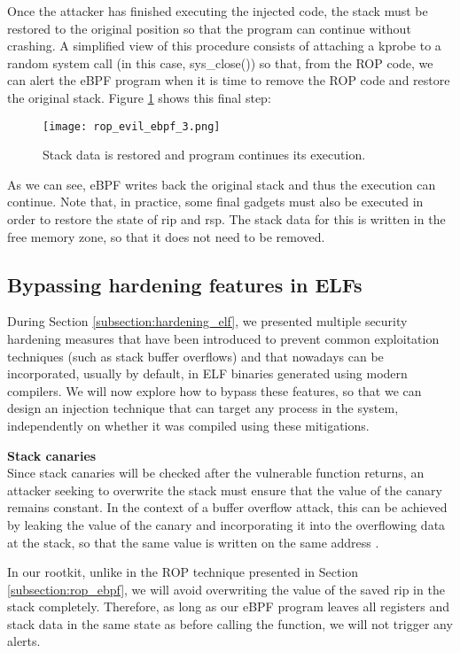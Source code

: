 Once the attacker has finished executing the injected code, the stack must be restored to the original position so that the program can continue without crashing. A simplified view of this procedure consists of attaching a kprobe to a random system call (in this case, sys\_close()) so that, from the ROP code, we can alert the eBPF program when it is time to remove the ROP code and restore the original stack. Figure \ref{fig:rop_evil_ebpf_3} shows this final step:

\begin{figure}[H]
	\centering
	\texttt{[image: rop\_evil\_ebpf\_3.png]}
	\caption{Stack data is restored and program continues its execution.}
	\label{fig:rop_evil_ebpf_3}
\end{figure}

As we can see, eBPF writes back the original stack and thus the execution can continue. Note that, in practice, some final gadgets must also be executed in order to restore the state of rip and rsp. The stack data for this is written in the free memory zone, so that it does not need to be removed.



\subsection{Bypassing hardening features in ELFs} \label{subsection:hardening_bypass}
During Section \ref{subsection:hardening_elf}, we presented multiple  security hardening measures that have been introduced to prevent common exploitation techniques (such as stack buffer overflows) and that nowadays can be incorporated, usually by default, in ELF binaries generated using modern compilers. We will now explore how to bypass these features, so that we can design an injection technique that can target any process in the system, independently on whether it was compiled using these mitigations.

\textbf{Stack canaries}\\
Since stack canaries will be checked after the vulnerable function returns, an attacker seeking to overwrite the stack must ensure that the value of the canary remains constant. In the context of a buffer overflow attack, this can be achieved by leaking the value of the canary and incorporating it into the overflowing data at the stack, so that the same value is written on the same address \cite{canary_exploit}.

In our rootkit, unlike in the ROP technique presented in Section \ref{subsection:rop_ebpf}, we will avoid overwriting the value of the saved rip in the stack completely. Therefore, as long as our eBPF program leaves all registers and stack data in the same state as before calling the function, we will not trigger any alerts.

